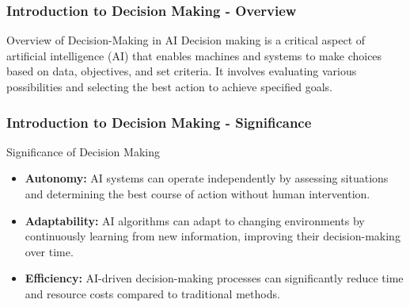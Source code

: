 \documentclass[aspectratio=169]{beamer}
\begin{document}
\frame{\titlepage}

\begin{frame}[fragile]
    \frametitle{Introduction to Decision Making - Overview}
    \begin{block}{Overview of Decision-Making in AI}
        Decision making is a critical aspect of artificial intelligence (AI) that enables machines and systems to make choices based on data, objectives, and set criteria. It involves evaluating various possibilities and selecting the best action to achieve specified goals.
    \end{block}
\end{frame}

\begin{frame}[fragile]
    \frametitle{Introduction to Decision Making - Significance}
    \begin{block}{Significance of Decision Making}
        \begin{itemize}
            \item \textbf{Autonomy:} AI systems can operate independently by assessing situations and determining the best course of action without human intervention.
            \item \textbf{Adaptability:} AI algorithms can adapt to changing environments by continuously learning from new information, improving their decision-making over time.
            \item \textbf{Efficiency:} AI-driven decision-making processes can significantly reduce time and resource costs compared to traditional methods.
        \end{itemize}
    \end{block}
\end{frame}
\end{document}
